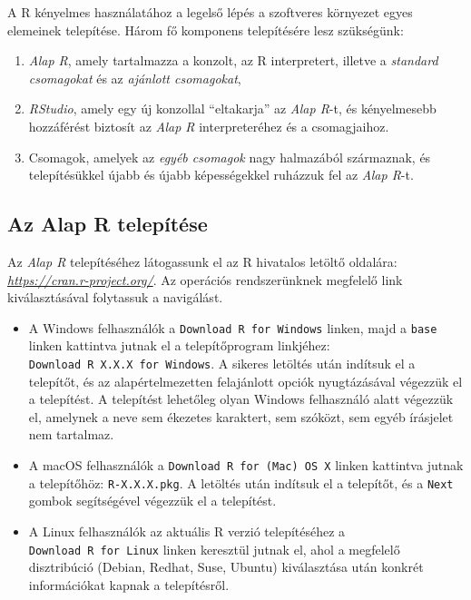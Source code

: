 \documentclass[
]{book}
\providecommand{\tightlist}{%
  \setlength{\itemsep}{0pt}\setlength{\parskip}{0pt}}
\begin{document}
A R kényelmes használatához a legelső lépés a szoftveres környezet egyes elemeinek telepítése. Három fő komponens telepítésére lesz szükségünk:

\begin{enumerate}
\def\labelenumi{\arabic{enumi}.}
\tightlist
\item
  \emph{Alap R}, amely tartalmazza a konzolt, az R interpretert, illetve a \emph{standard csomagokat} és az \emph{ajánlott csomagokat},
\item
  \emph{RStudio}, amely egy új konzollal ``eltakarja'' az \emph{Alap R}-t, és kényelmesebb hozzáférést biztosít az \emph{Alap R} interpreteréhez és a csomagjaihoz.
\item
  Csomagok, amelyek az \emph{egyéb csomagok} nagy halmazából származnak, és telepítésükkel újabb és újabb képességekkel ruházzuk fel az \emph{Alap R}-t.
\end{enumerate}

\hypertarget{az-alap-r-telepitese}{%
\subsection{Az Alap R telepítése}\label{az-alap-r-telepitese}}

Az \emph{Alap R} telepítéséhez látogassunk el az R hivatalos letöltő oldalára: \emph{\url{https://cran.r-project.org/}}. Az operációs rendszerünknek megfelelő link kiválasztásával folytassuk a navigálást.

\begin{itemize}
\tightlist
\item
  A Windows felhasználók a \texttt{Download\ R\ for\ Windows} linken, majd a \texttt{base} linken kattintva jutnak el a telepítőprogram linkjéhez: \texttt{Download\ R\ X.X.X\ for\ Windows}. A sikeres letöltés után indítsuk el a telepítőt, és az alapértelmezetten felajánlott opciók nyugtázásával végezzük el a telepítést. A telepítést lehetőleg olyan Windows felhasználó alatt végezzük el, amelynek a neve sem ékezetes karaktert, sem szóközt, sem egyéb írásjelet nem tartalmaz.
\item
  A macOS felhasználók a \texttt{Download\ R\ for\ (Mac)\ OS\ X} linken kattintva jutnak a telepítőhöz: \texttt{R-X.X.X.pkg}. A letöltés után indítsuk el a telepítőt, és a \texttt{Next} gombok segítségével végezzük el a telepítést.
\item
  A Linux felhasználók az aktuális R verzió telepítéséhez a \texttt{Download\ R\ for\ Linux} linken keresztül jutnak el, ahol a megfelelő disztribúció (Debian, Redhat, Suse, Ubuntu) kiválasztása után konkrét információkat kapnak a telepítésről.
\end{itemize}
\end{document}

